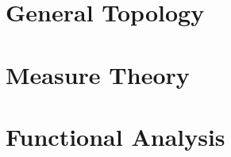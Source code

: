 \documentclass[a4paper]{book}
\numberwithin{equation}{section}
\theoremstyle{definition}
\begin{document}
  \tableofcontents

  \part{General Topology}
  

  \part{Measure Theory}
  

  \part{Functional Analysis}
  
\end{document}
